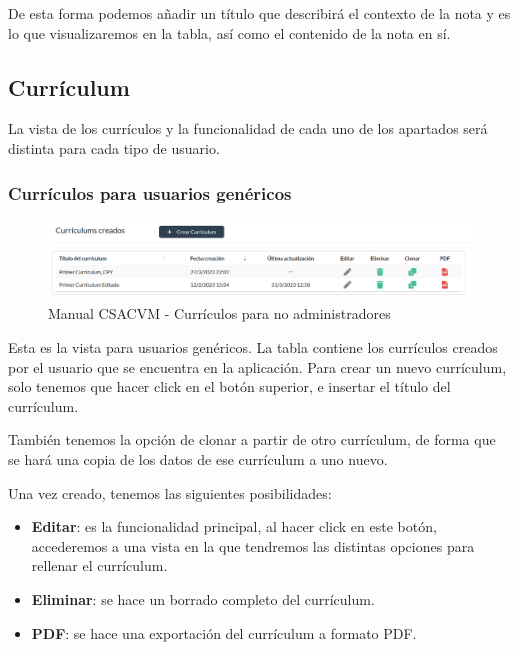 De esta forma podemos añadir un título que describirá el contexto de la nota y es lo que visualizaremos en la tabla, así como el contenido de la nota en sí.

\subsection{Currículum}
La vista de los currículos y la funcionalidad de cada uno de los apartados será distinta para cada tipo de usuario.
\subsubsection{Currículos para usuarios genéricos}
\begin{figure}
    \centering
    \includegraphics[width=\linewidth]{img/ManualUsuario/Manual11.png}
    \caption{Manual CSACVM - Currículos para no administradores}
    
\end{figure}

Esta es la vista para usuarios genéricos. La tabla contiene los currículos creados por el usuario que se encuentra en la aplicación. Para crear un nuevo currículum, solo tenemos que hacer click en el botón superior, e insertar el título del currículum.

También tenemos la opción de clonar a partir de otro currículum, de forma que se hará una copia de los datos de ese currículum a uno nuevo.

Una vez creado, tenemos las siguientes posibilidades:
\begin{itemize}
    \item \textbf{Editar}: es la funcionalidad principal, al hacer click en este botón, accederemos a una vista en la que tendremos las distintas opciones para rellenar el currículum.
    \item \textbf{Eliminar}: se hace un borrado completo del currículum.
    \item \textbf{PDF}: se hace una exportación del currículum a formato PDF.
\end{itemize}

